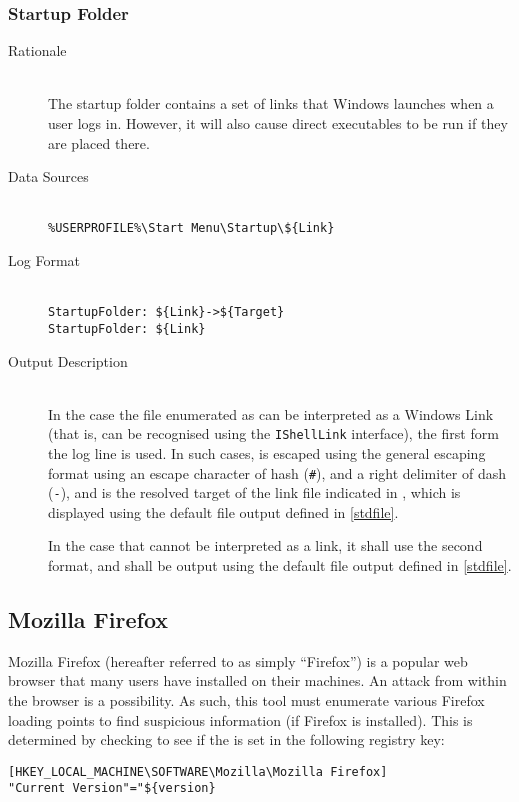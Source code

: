 \subsubsection{Startup Folder}
\begin{description}
\item[Rationale] \hfill \\
The startup folder contains a set of links that Windows launches when a user
logs in. However, it will also cause direct executables to be run if they are
placed there.
\item[Data Sources] \hfill \\
\verb|%USERPROFILE%\Start Menu\Startup\${Link}|
\item[Log Format] \hfill \\
\verb|StartupFolder: ${Link}->${Target}| \\
\verb|StartupFolder: ${Link}|
\item[Output Description] \hfill \\
In the case the file enumerated as  can be interpreted as a Windows
Link (that is, can be recognised using the \verb|IShellLink| interface), the
first form the log line is used. In such cases,  is escaped using the
general escaping format using an escape character of hash (\verb|#|), and a
right delimiter of dash (\verb|-|), and  is the resolved target of
the link file indicated in , which is displayed using the default file
output defined in \ref{stdfile}.

In the case that  cannot be interpreted as a link, it shall use the
second format, and  shall be output using the default file output
defined in \ref{stdfile}.
\end{description}

\subsection{Mozilla Firefox}
Mozilla Firefox (hereafter referred to as simply ``Firefox'') is a popular web
browser that many users have installed on their machines.  An attack from within
the browser is a possibility.  As such, this tool must enumerate various Firefox
loading points to find suspicious information (if Firefox is installed).  This
is determined by checking to see if the  is set in the following
registry key:
\begin{verbatim}
[HKEY_LOCAL_MACHINE\SOFTWARE\Mozilla\Mozilla Firefox] 
"Current Version"="${version}
\end{verbatim}

